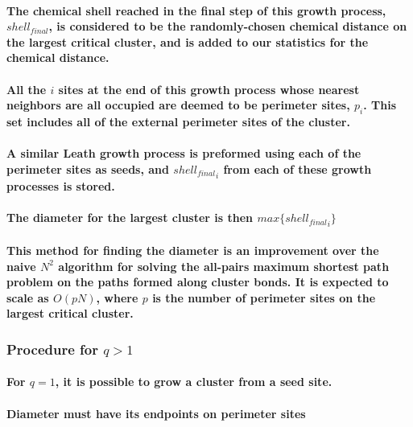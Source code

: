 \documentclass[pre,preprint]{revtex4-1}
\begin{document}
\paragraph{The chemical shell reached in the final step of this growth process, $shell_{final}$, is considered to be the randomly-chosen chemical distance on the largest critical cluster, and is added to our statistics for the chemical distance.}
\label{sec-1.2.3.4}
\paragraph{All the $i$ sites at the end of this growth process whose nearest neighbors are all occupied are deemed to be perimeter sites, $p_i$.  This set includes all of the external perimeter sites of the cluster.}
\label{sec-1.2.3.5}
\paragraph{A similar Leath growth process is preformed using each of the perimeter sites as seeds, and ${shell_{final}}_i$ from each of these growth processes is stored.}
\label{sec-1.2.3.6}
\paragraph{The diameter for the largest cluster is then $max\{{shell_{final}}_i\}$}
\label{sec-1.2.3.7}
\paragraph{This method for finding the diameter is an improvement over the naive $N^2$ algorithm for solving the all-pairs maximum shortest path problem on the paths formed along cluster bonds. It is expected to scale as $O(pN)$, where $p$ is the number of perimeter sites on the largest critical cluster.}
\label{sec-1.2.3.8}
\subsubsection{Procedure for $q>1$}
\label{sec-1.2.4}
\paragraph{For $q=1$, it is possible to grow a cluster from a seed site.}
\label{sec-1.2.4.1}
\paragraph{Diameter must have its endpoints on perimeter sites}
\label{sec-1.2.4.2}
\end{document}
